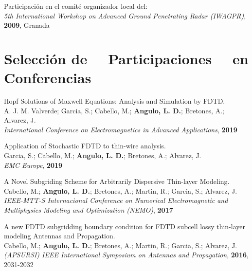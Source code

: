 \documentclass[a4paper,margin,line]{res}
\begin{document}
\begin{resume}
\begin{minipage}{\textwidth}
  Participación en el comité organizador local del:\\
  \textit{5th International Workshop on Advanced Ground Penetrating Radar (IWAGPR)}, \textbf{2009}, Granada
\end{minipage}

\section{\sc Selección de \ \ Participaciones \ \  en Conferencias}
\begin{minipage}{\textwidth}
	Hopf Solutions of Maxwell Equations: Analysis and Simulation by FDTD.\\
	A. J. M. Valverde; Garcia, S.; Cabello, M.; \textbf{Angulo, L. D.}; Bretones, A.; Alvarez, J.\\
	\textit{International Conference on Electromagnetics in Advanced Applications}, \textbf{2019}
\end{minipage}

\begin{minipage}{\textwidth}
	Application of Stochastic FDTD to thin-wire analysis.\\
	Garcia, S.; Cabello, M.; \textbf{Angulo, L. D.}; Bretones, A.; Alvarez, J.\\
	\textit{EMC Europe}, \textbf{2019}
\end{minipage}

\begin{minipage}{\textwidth}
  A Novel Subgriding Scheme for Arbitrarily Dispersive Thin-layer Modeling.\\
  Cabello, M.; \textbf{Angulo, L. D.}; Bretones, A.; Martin, R.; Garcia, S.; Alvarez, J.\\
  \textit{IEEE-MTT-S Internacional Conference on Numerical Electromagnetic and Multiphysics Modeling and Optimization (NEMO)}, \textbf{2017}
\end{minipage}

\begin{minipage}{\textwidth}
A new FDTD subgridding boundary condition for FDTD subcell lossy thin-layer modeling Antennas and Propagation.\\
Cabello, M.; \textbf{Angulo, L. D.}; Bretones, A.; Martin, R.; Garcia, S.; Alvarez, J.\\
\textit{(APSURSI) IEEE International Symposium on Antennas and Propagation}, \textbf{2016}, 2031-2032
\end{minipage}


\end{resume}
\end{document}
